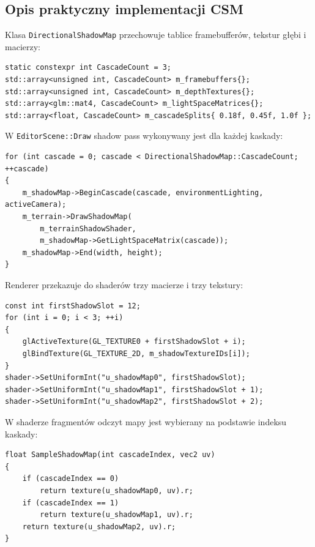 \documentclass[12pt,a4paper]{article}
\begin{document}
\subsection{Opis praktyczny implementacji CSM}

Klasa \texttt{DirectionalShadowMap} przechowuje tablice framebufferów, tekstur głębi i macierzy:

\begin{lstlisting}[style=cppstyle,caption={Dane trzech kaskad w DirectionalShadowMap.}]
static constexpr int CascadeCount = 3;
std::array<unsigned int, CascadeCount> m_framebuffers{};
std::array<unsigned int, CascadeCount> m_depthTextures{};
std::array<glm::mat4, CascadeCount> m_lightSpaceMatrices{};
std::array<float, CascadeCount> m_cascadeSplits{ 0.18f, 0.45f, 1.0f };
\end{lstlisting}

W \texttt{EditorScene::Draw} shadow pass wykonywany jest dla każdej kaskady:

\begin{lstlisting}[style=cppstyle,caption={Renderowanie trzech kaskad shadow mapy.}]
for (int cascade = 0; cascade < DirectionalShadowMap::CascadeCount; ++cascade)
{
    m_shadowMap->BeginCascade(cascade, environmentLighting, activeCamera);
    m_terrain->DrawShadowMap(
        m_terrainShadowShader,
        m_shadowMap->GetLightSpaceMatrix(cascade));
    m_shadowMap->End(width, height);
}
\end{lstlisting}

Renderer przekazuje do shaderów trzy macierze i trzy tekstury:

\begin{lstlisting}[style=cppstyle,caption={Bindowanie trzech shadow map w rendererze.}]
const int firstShadowSlot = 12;
for (int i = 0; i < 3; ++i)
{
    glActiveTexture(GL_TEXTURE0 + firstShadowSlot + i);
    glBindTexture(GL_TEXTURE_2D, m_shadowTextureIDs[i]);
}
shader->SetUniformInt("u_shadowMap0", firstShadowSlot);
shader->SetUniformInt("u_shadowMap1", firstShadowSlot + 1);
shader->SetUniformInt("u_shadowMap2", firstShadowSlot + 2);
\end{lstlisting}

W shaderze fragmentów odczyt mapy jest wybierany na podstawie indeksu kaskady:

\begin{lstlisting}[style=glslstyle,caption={Odczyt właściwej shadow mapy.}]
float SampleShadowMap(int cascadeIndex, vec2 uv)
{
    if (cascadeIndex == 0)
        return texture(u_shadowMap0, uv).r;
    if (cascadeIndex == 1)
        return texture(u_shadowMap1, uv).r;
    return texture(u_shadowMap2, uv).r;
}
\end{lstlisting}
\end{document}
